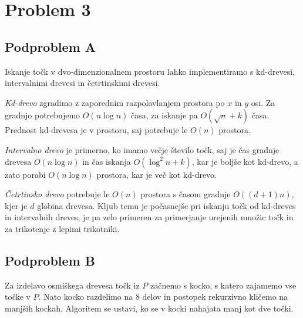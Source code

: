 \documentclass{article}
\begin{document}
\section{Problem 3}

\subsection{Podproblem A}

Iskanje točk v dvo-dimenzionalnem prostoru lahko implementiramo s kd-drevesi,
intervalnimi drevesi in četrtinskimi drevesi.

\textit{Kd-drevo} zgradimo z zaporednim razpolavlanjem prostora po $x$ in $y$
osi. Za gradnjo potrebujemo $O(n \log n)$ časa, za iskanje pa $O(\sqrt{n} + k)$
časa. Prednost kd-drevesa je v prostoru, saj potrebuje le $O(n)$ prostora.

\textit{Intervalno drevo} je primerno, ko imamo večje število točk, saj je čas
gradnje drevesa $O(n \log n)$ in čas iskanja $O(\log^2 n + k)$, kar je boljše
kot kd-drevo, a zato porabi $O(n \log n)$ prostora, kar je več kot kd-drevo.

\textit{Četrtinsko drevo} potrebuje le $O(n)$ prostora s časom gradnje
$O((d+1)n)$, kjer je $d$ globina drevesa. Kljub temu je počasnejše pri iskanju
točk od kd-dreves in intervalnih dreves, je pa zelo primeren za primerjanje
urejenih množic točk in za trikotenje z lepimi trikotniki.

\subsection{Podproblem B}

Za izdelavo osmiškega drevesa točk iz $P$ začnemo s kocko, s katero zajamemo vse
točke v $P$. Nato kocko razdelimo na 8 delov in postopek rekurzivno kličemo na
manjših kockah. Algoritem se ustavi, ko se v kocki nahajata manj kot dve točki.




\end{document}
